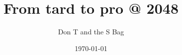 \documentclass[article, oneside, a4paper]{memoir}
\title{From tard to pro @ 2048}
\author{Don T and the S Bag}
\date{\today}
\begin{document}
\frontmatter
\maketitle

\tableofcontents*
\clearpage

\mainmatter





\end{document}
